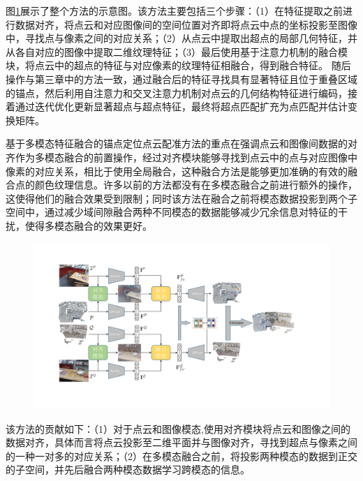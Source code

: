     图\ref{fig:4-2}展示了整个方法的示意图。该方法主要包括三个步骤：（1）在特征提取之前进行数据对齐，将点云和对应图像间的空间位置对齐即将点云中点的坐标投影至图像中，寻找点与像素之间的对应关系；（2）从点云中提取出超点的局部几何特征，并从各自对应的图像中提取二维纹理特征；（3）最后使用基于注意力机制的融合模块，将点云中的超点的特征与对应像素的纹理特征相融合，得到融合特征。
    随后操作与第三章中的方法一致，通过融合后的特征寻找具有显著特征且位于重叠区域的锚点，然后利用自注意力和交叉注意力机制对点云的几何结构特征进行编码，接着通过迭代优化更新显著超点与超点特征，最终将超点匹配扩充为点匹配并估计变换矩阵。

    基于多模态特征融合的锚点定位点云配准方法的重点在强调点云和图像间数据的对齐作为多模态融合的前置操作，经过对齐模块能够寻找到点云中的点与对应图像中像素的对应关系，相比于使用全局融合，这种融合方法是能够更加准确的有效的融合点的颜色纹理信息。许多以前的方法都没有在多模态融合之前进行额外的操作，这使得他们的融合效果受到限制；同时该方法在融合之前将模态数据投影到两个子空间中，通过减少域间隙融合两种不同模态的数据能够减少冗余信息对特征的干扰，使得多模态融合的效果更好。

    \vspace{-0.1cm}
    \begin{figure}[h]
        \centering
        \includegraphics[width = \textwidth]{my/figure/4-2.pdf}
        \label{fig:4-2}
    \end{figure}
    \vspace{-0.35cm}

    该方法的贡献如下：（1）对于点云和图像模态,使用对齐模块将点云和图像之间的数据对齐，具体而言将点云投影至二维平面并与图像对齐，寻找到超点与像素之间的一种一对多的对应关系；（2）在多模态融合之前，将投影两种模态的数据到正交的子空间，并先后融合两种模态数据学习跨模态的信息。


